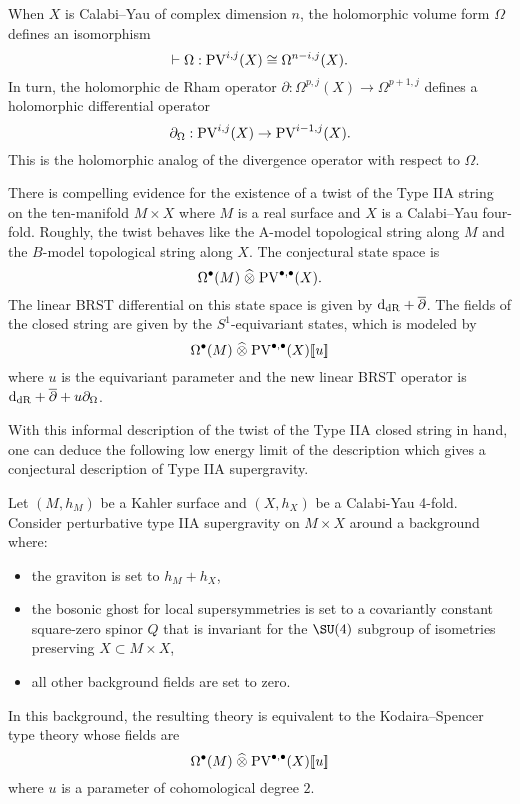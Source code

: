 \documentclass[11pt]{amsart}
\def\pv{{\rm PV}}
\def\PV{{\rm PV}}
\begin{document}
When $X$ is Calabi--Yau of complex dimension $n$, the holomorphic volume form $\Omega$ defines an isomorphism
\[
  \vdash \Omega : \pv^{i,j}(X) \cong \Omega^{n-i, j}(X).
\]
In turn, the holomorphic de Rham operator $\partial : \Omega^{p, j}(X) \to \Omega^{p+1,j}$ defines a holomorphic differential operator
\[
  \partial_{\Omega} : \pv^{i,j}(X) \to \pv^{i-1,j}(X) .
\]
This is the holomorphic analog of the divergence operator with respect to $\Omega$.

There is compelling evidence \cite{CLsugra} for the existence of a twist of the Type IIA string on the ten-manifold $M \times X$ where $M$ is a real surface and $X$ is a Calabi--Yau four-fold.
Roughly, the twist behaves like the A-model topological string along $M$ and the $B$-model topological string along $X$.
The conjectural state space is
\[
  \Omega^\bu(M) \; \Hat{\otimes} \; \PV^{\bu, \bu} (X) .
\]
The linear BRST differential on this state space is given by ${\rm d}_{\rm dR} + \overline{\partial}$.
The fields of the closed string are given by the $S^1$-equivariant states, which is modeled \cite{CLbcov} by
\[
  \Omega^\bu(M) \; \Hat{\otimes} \; \PV^{\bu, \bu} (X) [\![u]\!]
\]
where $u$ is the equivariant parameter and the new linear BRST operator is ${\rm d}_{\rm dR} + \overline{\partial} + u \partial_\Omega$.

With this informal description of the twist of the Type IIA closed string in hand, one can deduce the following low energy limit of the description which gives a conjectural description of Type IIA supergravity.

\begin{conj}
  Let $(M,h_{M})$ be a Kahler surface and $(X, h_{X})$ be a Calabi-Yau 4-fold.
  Consider perturbative type IIA supergravity on $M\times X$ around a background where:
  \begin{itemize}
    \item the graviton is set to $h_{M}+ h_{X}$,
    \item the bosonic ghost for local supersymmetries is set to a covariantly constant square-zero spinor $Q$ that is invariant for the $\SU(4)$ subgroup of isometries preserving $X\subset M\times X$,
    \item all other background fields are set to zero.
  \end{itemize}
  In this background, the resulting theory is equivalent to the Kodaira--Spencer type theory whose fields are
  \[
    \Omega^{\bullet}(M) \; \Hat{\otimes} \; \PV^{\bullet, \bullet}(X)[\![u]\!]
  \]
  where $u$ is a parameter of cohomological degree $2$.
\end{conj}
\end{document}

